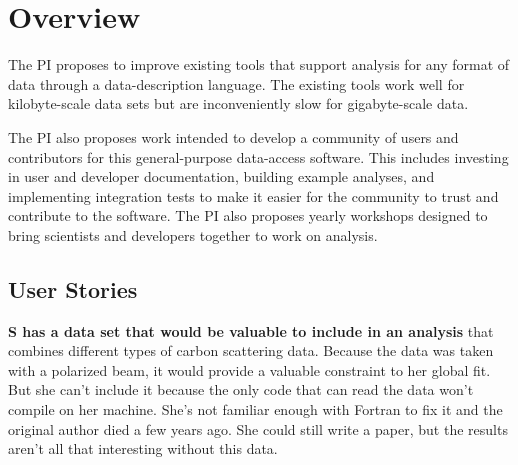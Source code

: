 
\section{Overview}
The PI proposes to improve existing tools that support analysis for any format of data through a data-description language. The existing tools work well for kilobyte-scale data sets but are inconveniently slow for gigabyte-scale data.

The PI also proposes work intended to develop a community of users and contributors for this general-purpose data-access software.  This includes investing in user and developer documentation, building example analyses, and implementing integration tests to make it easier for the community to trust and contribute to the software.  The PI also proposes yearly workshops designed to bring scientists and developers together to work on analysis.


\subsection{User Stories}
\textbf{S has a data set that would be valuable to include in an analysis} that combines different types of carbon scattering data.  Because the data was taken with a polarized beam, it would provide a valuable constraint to her global fit.  But she can't include it because the only code that can read the data won't compile on her machine.  She's not familiar enough with Fortran to fix it and the original author died a few years ago.  She could still write a paper, but the results aren't all that interesting without this data. 
 
